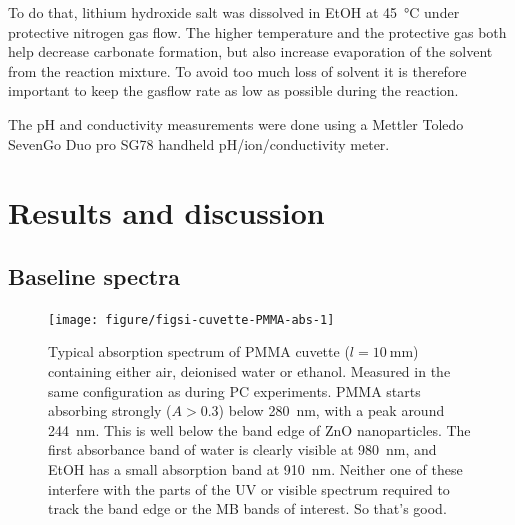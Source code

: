 \documentclass[9pt,twoside,twocolumn]{article}\usepackage{knitr}
\begin{document}
\begin{refsection}
To do that, lithium hydroxide salt was dissolved in EtOH at \qty{45}{\degreeCelsius} under protective nitrogen gas flow. The higher temperature and the protective gas both help decrease carbonate formation, but also increase evaporation of the solvent from the reaction mixture. 
To avoid too much loss of solvent it is therefore important to keep the gasflow rate as low as possible during the reaction.

The pH and conductivity measurements were done using a Mettler Toledo SevenGo Duo pro{\texttrademark} SG78 handheld pH/ion/conductivity meter.





\section*{Results and discussion}

\subsection*{Baseline spectra}

\begin{figure}[tb]
\centering
\begin{knitrout}\footnotesize
{}\color{fgcolor}

{\centering \texttt{[image: figure/figsi-cuvette-PMMA-abs-1]} 

}


\end{knitrout}
\caption{Typical absorption spectrum of PMMA cuvette ($l=\qty{10}{\mm}$) containing either air, deionised water or ethanol. 
Measured in the same configuration as during PC experiments.
PMMA starts absorbing strongly ($A > \num{0.3}$) below \qty{280}{\nm}, with a peak around \qty{244}{\nm}. This is well below the band edge of ZnO nanoparticles.
The first absorbance band of water is clearly visible at \qty{980}{\nm}, and EtOH has a small absorption band at \qty{910}{\nm}. 
Neither one of these interfere with the parts of the UV or visible spectrum required to track the  band edge or the MB bands of interest. So that's good.}
\label{figsi:cuvette-PMMA-abs}
\end{figure}




\begin{figure}[tbp]
\centering
\begin{knitrout}\footnotesize
{}\color{fgcolor}


\end{knitrout}
\end{figure}
\end{refsection}
\end{document}
